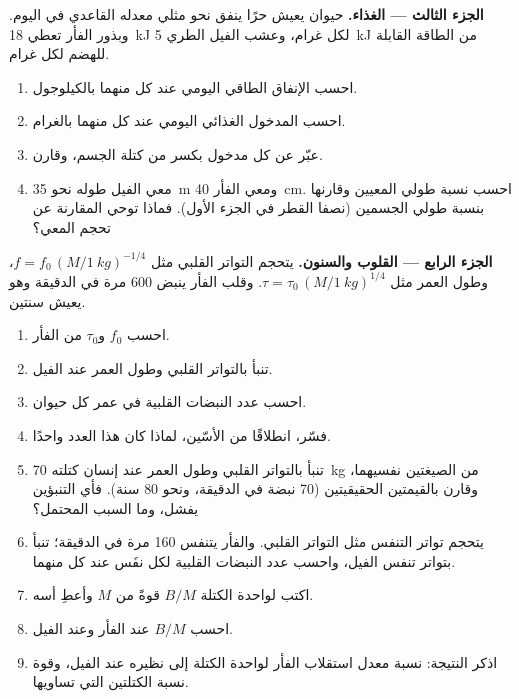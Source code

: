 \begin{problem}
\medskip
\noindent\textbf{الجزء الثالث --- الغذاء.}
حيوان يعيش حرًا ينفق نحو مثلي معدله القاعدي في اليوم. وبذور الفأر
تعطي \qty{18}{kJ} لكل غرام، وعشب الفيل الطري \qty{5}{kJ} من الطاقة
القابلة للهضم لكل غرام.
\begin{enumerate}[resume]
  \item احسب الإنفاق الطاقي اليومي عند كل منهما بالكيلوجول.
  \item احسب المدخول الغذائي اليومي عند كل منهما بالغرام.
  \item عبّر عن كل مدخول بكسر من كتلة الجسم، وقارن.
  \item معي الفيل طوله نحو \qty{35}{m} ومعي الفأر \qty{40}{cm}.
        احسب نسبة طولي المعيين وقارنها بنسبة طولي الجسمين (نصفا
        القطر في الجزء الأول). فماذا توحي المقارنة عن تحجم المعي؟
\end{enumerate}

\medskip
\noindent\textbf{الجزء الرابع --- القلوب والسنون.}
يتحجم التواتر القلبي مثل $f = f_0\,(M/\qty{1}{kg})^{-1/4}$، وطول
العمر مثل $\tau = \tau_0\,(M/\qty{1}{kg})^{1/4}$. وقلب الفأر ينبض
\qty{600}{} مرة في الدقيقة وهو يعيش سنتين.
\begin{enumerate}[resume]
  \item احسب $f_0$ و$\tau_0$ من الفأر.
  \item تنبأ بالتواتر القلبي وطول العمر عند الفيل.
  \item احسب عدد النبضات القلبية في عمر كل حيوان.
  \item فسّر، انطلاقًا من الأسّين، لماذا كان هذا العدد واحدًا.
  \item تنبأ بالتواتر القلبي وطول العمر عند إنسان كتلته
        \qty{70}{kg} من الصيغتين نفسيهما، وقارن بالقيمتين
        الحقيقيتين (\qty{70}{} نبضة في الدقيقة، ونحو \qty{80}{}
        سنة). فأي التنبؤين يفشل، وما السبب المحتمل؟
  \item يتحجم تواتر التنفس مثل التواتر القلبي. والفأر يتنفس
        \qty{160}{} مرة في الدقيقة؛ تنبأ بتواتر تنفس الفيل، واحسب
        عدد النبضات القلبية لكل نفَس عند كل منهما.
  \item اكتب  لواحدة الكتلة $B/M$ قوةً من $M$ وأعطِ
        أسه.
  \item احسب $B/M$ عند الفأر وعند الفيل.
  \item اذكر النتيجة: نسبة معدل استقلاب الفأر لواحدة الكتلة إلى
        نظيره عند الفيل، وقوة نسبة الكتلتين التي تساويها.
\end{enumerate}
\end{problem}
